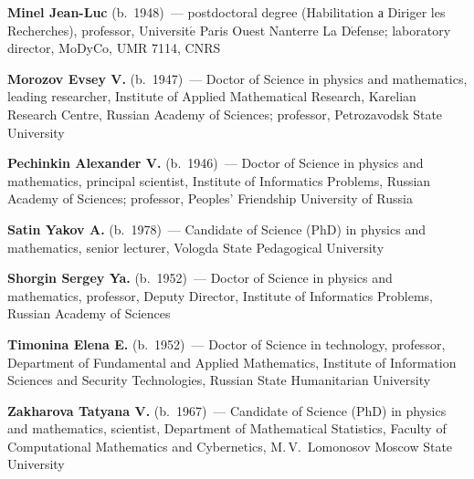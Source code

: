\begin{multicols}{2}
\vspace*{3pt}

\noindent
\textbf{Minel Jean-Luc}  (b.\ 1948)~--- postdoctoral degree (Habilitation а Diriger les Recherches), 
professor, Universit$\acute{\mbox{e}}$ Paris Ouest Nanterre La D$\acute{\mbox{e}}$fense; 
laboratory director, MoDyCo, UMR 7114, CNRS

\vspace*{3pt}

\noindent
\textbf{Morozov Evsey V.} (b.\ 1947)~--- Doctor of Science in physics and mathematics, 
leading researcher, Institute of Applied Mathematical  Research, 
Karelian Research Centre, Russian Academy of Sciences; professor, Petrozavodsk State University

\vspace*{3pt}

\noindent
\textbf{Pechinkin Alexander V.} (b.\ 1946)~--- Doctor of Science in physics and mathematics,
principal scientist, Institute of Informatics Problems, Russian Academy of Sciences; 
professor, Peoples' Friendship University of Russia 

\vspace*{3pt}

\noindent
\textbf{Satin Yakov A.} (b.\ 1978)~--- Candidate of Science (PhD) in physics and
mathematics, senior lecturer, Vologda State Pedagogical University

\vspace*{3pt}

\noindent
\textbf{Shorgin Sergey Ya.} (b.\ 1952)~--- Doctor of Science in physics and mathematics, professor, 
Deputy Director, Institute of Informatics Problems, Russian Academy of Sciences

\vspace*{3pt}

\noindent
\textbf{Timonina Elena E.} (b.\ 1952)~--- Doctor of Science in technology, professor, Department of Fundamental 
and Applied Mathematics, Institute of Information Sciences and Security Technologies, Russian State Humanitarian 
University 
\pagebreak


\noindent
\textbf{Zakharova Tatyana V.} (b.\ 1967)~--- Candidate of Science (PhD) in physics and mathematics, scientist,
Department of Mathematical Statistics, 
Faculty of Computational Mathematics and Cybernetics, M.\,V.~Lomonosov Moscow State Univer\-sity


\vspace*{3pt}


\end{multicols}
